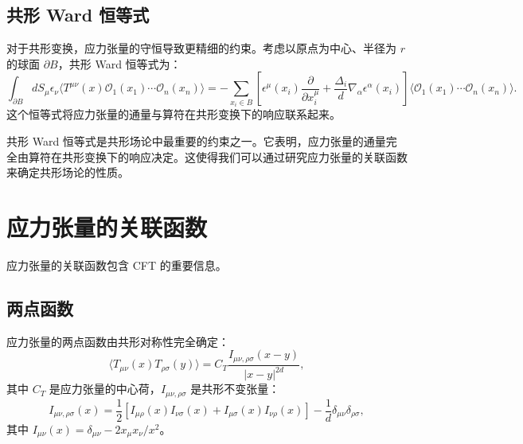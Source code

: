 \subsection{共形 Ward 恒等式}

\begin{theorem}
对于共形变换，应力张量的守恒导致更精细的约束。考虑以原点为中心、半径为 $r$ 的球面 $\partial B$，共形 Ward 恒等式为：
\begin{equation}
    \int_{\partial B} dS_\mu \epsilon_\nu \langle T^{\mu\nu}(x) \mathcal{O}_1(x_1) \cdots \mathcal{O}_n(x_n) \rangle = -\sum_{x_i \in B} \left[\epsilon^\mu(x_i) \frac{\partial}{\partial x_i^\mu} + \frac{\Delta_i}{d} \nabla_\alpha \epsilon^\alpha(x_i)\right] \langle \mathcal{O}_1(x_1) \cdots \mathcal{O}_n(x_n) \rangle.
\end{equation}
这个恒等式将应力张量的通量与算符在共形变换下的响应联系起来。
\end{theorem}

\begin{remark}
共形 Ward 恒等式是共形场论中最重要的约束之一。它表明，应力张量的通量完全由算符在共形变换下的响应决定。这使得我们可以通过研究应力张量的关联函数来确定共形场论的性质。
\end{remark}

\section{应力张量的关联函数}

应力张量的关联函数包含 CFT 的重要信息。

\subsection{两点函数}

\begin{theorem}[应力张量的两点函数]
应力张量的两点函数由共形对称性完全确定：
\begin{equation}
    \langle T_{\mu\nu}(x) T_{\rho\sigma}(y) \rangle = C_T \frac{I_{\mu\nu,\rho\sigma}(x-y)}{|x-y|^{2d}},
\end{equation}
其中 $C_T$ 是应力张量的中心荷，$I_{\mu\nu,\rho\sigma}$ 是共形不变张量：
\begin{equation}
    I_{\mu\nu,\rho\sigma}(x) = \frac{1}{2} \left[I_{\mu\rho}(x) I_{\nu\sigma}(x) + I_{\mu\sigma}(x) I_{\nu\rho}(x)\right] - \frac{1}{d} \delta_{\mu\nu} \delta_{\rho\sigma},
\end{equation}
其中 $I_{\mu\nu}(x) = \delta_{\mu\nu} - 2x_\mu x_\nu / x^2$。
\end{theorem}

